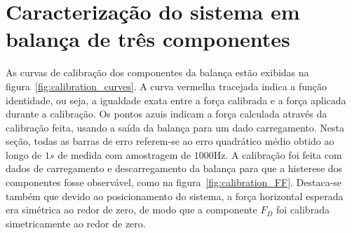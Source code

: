 \section{Caracterização do sistema em balança de três componentes}\label{sec:result_characterization}

As curvas de calibração dos componentes da balança estão exibidas na figura~\ref{fig:calibration_curves}. A curva vermelha tracejada indica a função identidade, ou seja, a igualdade exata entre a força calibrada e a força aplicada durante a calibração. Os pontos azuis indicam a força calculada através da calibração feita, usando a saída da balança para um dado carregamento. Nesta seção, todas as barras de erro referem-se ao erro quadrático médio obtido ao longo de \(1s\) de medida com amostragem de \(1000\mathrm{Hz}\). A calibração foi feita com dados de carregamento e descarregamento da balança para que a histerese dos componentes fosse observável, como na figura~\ref{fig:calibration_FF}. Destaca-se também que devido ao posicionamento do sistema, a força horizontal esperada era simétrica ao redor de zero, de modo que a componente \(F_D\) foi calibrada simetricamente ao redor de zero.

